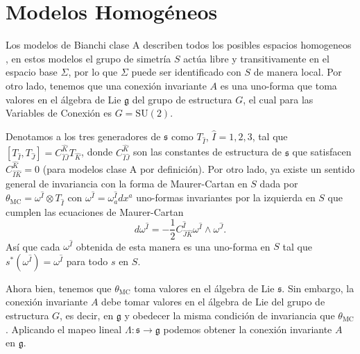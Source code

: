 \section{Modelos Homog\'{e}neos}

Los modelos de Bianchi clase A describen todos los posibles espacios homogeneos \cite{Wald}, en estos modelos el grupo de simetr\'{i}a $S$ act\'{u}a libre y transitivamente en el espacio base $\Sigma$, por lo que $\Sigma$ puede ser identificado con $S$ de manera local. Por otro lado, tenemos que una conexi\'{o}n invariante $A$ es una uno-forma que toma valores en el \'{a}lgebra de Lie $\mathfrak{g}$ del grupo de estructura $G$, el cual para las Variables de Conexi\'{o}n es $G=\mathrm{SU}(2)$.

Denotamos a los tres generadores de $\mathfrak{s}$ como $T_{\hat{I}}$, $\hat{I}=1,2,3$, tal que $\left[ T_{\hat{I}}, T_{\hat{J}} \right] = C^{\hat{K}}_{\hat{I}\hat{J}} T_{\hat{K}}$, donde $C^{\hat{K}}_{\hat{I}\hat{J}}$ son las constantes de estructura de $\mathfrak{s}$ que satisfacen $C^{\hat{K}}_{\hat{I}\hat{K}} = 0$ (para modelos clase A por definici\'{o}n). Por otro lado, ya existe un sentido general de invariancia con la forma de Maurer-Cartan en $S$ dada por $\theta_{\mathrm{MC}} = \omega^{\hat{I}} \otimes T_{\hat{I}}$ con $\omega^{\hat{I}} = \omega^{\hat{I}}_{a} dx^{a}$ uno-formas invariantes por la izquierda en $S$ que cumplen las ecuaciones de Maurer-Cartan
%
\begin{equation}
d \omega^{\hat{I}} = -\frac{1}{2} C^{\hat{I}}_{\hat{J} \hat{K}} \omega^{\hat{I}} \wedge \omega^{\hat{J}}.
\end{equation}
%
As\'{i} que cada $\omega^{\hat{I}}$ obtenida de esta manera es una uno-forma en $S$ tal que $s^{*}(\omega^{\hat{I}}) = \omega^{\hat{I}}$ para todo $s$ en $S$.

Ahora bien, tenemos que $\theta_{\mathrm{MC}}$ toma valores en el \'{a}lgebra de Lie $\mathfrak{s}$. Sin embargo, la conexi\'{o}n invariante $A$ debe tomar valores en el \'{a}lgebra de Lie del grupo de estructura $G$, es decir, en $\mathfrak{g}$ y obedecer la misma condici\'{o}n de invariancia que $\theta_{\mathrm{MC}}$. Aplicando el mapeo lineal $\Lambda: \mathfrak{s} \longrightarrow \mathfrak{g}$ podemos obtener la conexi\'{o}n invariante $A$ en $\mathfrak{g}$.

